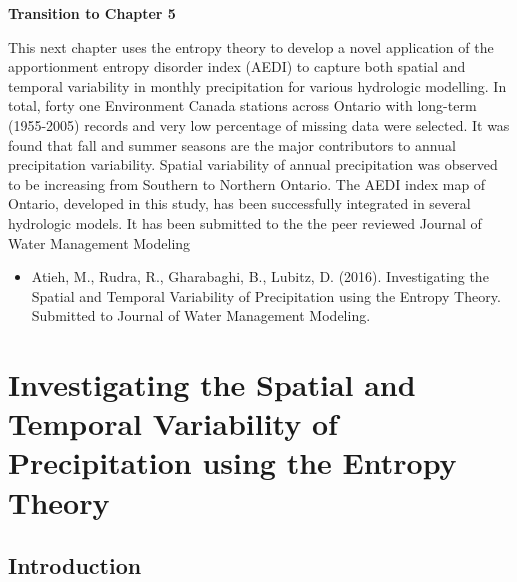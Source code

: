 \textbf{Transition to Chapter 5}

This next chapter uses the entropy theory to develop a novel application of the apportionment entropy disorder index (AEDI) to capture both spatial and temporal variability in monthly precipitation for various hydrologic modelling. In total, forty one Environment Canada stations across Ontario with long-term (1955-2005) records and very low percentage of missing data were selected. It was found that fall and summer seasons are the major contributors to annual precipitation variability. Spatial variability of annual precipitation was observed to be increasing from Southern to Northern Ontario. The AEDI index map of Ontario, developed in this study, has been successfully integrated in several hydrologic models. It has been submitted to the the peer reviewed Journal of Water Management Modeling

\begin{itemize}
	\item Atieh, M., Rudra, R., Gharabaghi, B., Lubitz, D. (2016). Investigating the Spatial and Temporal Variability of Precipitation using the Entropy Theory. Submitted to Journal of Water Management Modeling.
\end{itemize}

\chapter{Investigating the Spatial and Temporal Variability of Precipitation using the Entropy Theory}

\section{Introduction}


